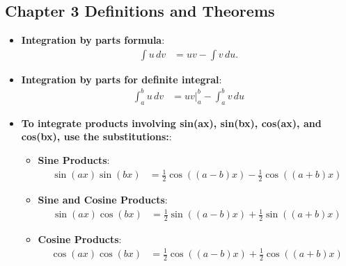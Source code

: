 \documentclass{report}
\begin{document}
    \subsection{Chapter 3 Definitions and Theorems}
    \bigbreak \noindent 
    \begin{itemize}
        \item \textbf{Integration by parts formula}: 
            \begin{align*}
                \int u \, dv &= uv - \int v \, du 
            .\end{align*}
        \item \textbf{Integration by parts for definite integral}:
            \begin{align*}
                \int_{a}^{b} u \, dv &= uv\big|_{a}^{b} - \int_{a}^{b} v \, du
            \end{align*}
        \item \textbf{To integrate products involving  sin(ax), sin(bx), cos(ax), and  cos(bx), use the substitutions:}:
            \begin{itemize}
                \item \textbf{Sine Products}:
                    \begin{align*}
                        \sin(ax) \sin(bx) &= \frac{1}{2} \cos((a-b)x) - \frac{1}{2} \cos((a+b)x)
                    \end{align*}

                \item \textbf{Sine and Cosine Products}:
                    \begin{align*}
                        \sin(ax) \cos(bx) &= \frac{1}{2} \sin((a-b)x) + \frac{1}{2} \sin((a+b)x)
                    \end{align*}

                \item \textbf{Cosine Products}:
                    \begin{align*}
                        \cos(ax) \cos(bx) &= \frac{1}{2} \cos((a-b)x) + \frac{1}{2} \cos((a+b)x)
                    \end{align*}


\end{itemize}
\end{itemize}
\end{document}
